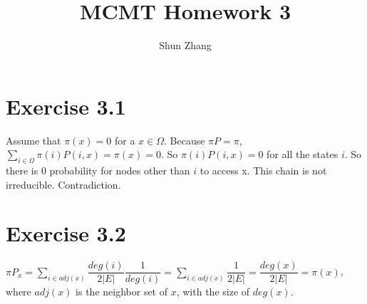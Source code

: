 \documentclass[10pt]{article}
\title{MCMT Homework 3}
\author{Shun Zhang}
\date{}
\begin{document}
\maketitle

\section*{Exercise 3.1}

Assume that $\pi(x) = 0$ for a $x \in \Omega$. Because $\pi P = \pi$, $\sum_{i
\in \Omega} \pi(i) P(i, x) = \pi(x) = 0$.  So $\pi(i) P(i, x) = 0$ for all the
states $i$. So there is 0 probability for nodes other than $i$ to access x.
This chain is not irreducible. Contradiction.

\section*{Exercise 3.2}

$\pi P_x = \sum_{i \in adj(x)} \dfrac{deg(i)}{2|E|} \dfrac{1}{deg(i)}
= \sum_{i \in adj(x)} \dfrac{1}{2|E|}
= \dfrac{deg(x)}{2|E|}
= \pi(x)
$, where $adj(x)$ is the neighbor set of $x$, with the size of $deg(x)$.
\end{document}
